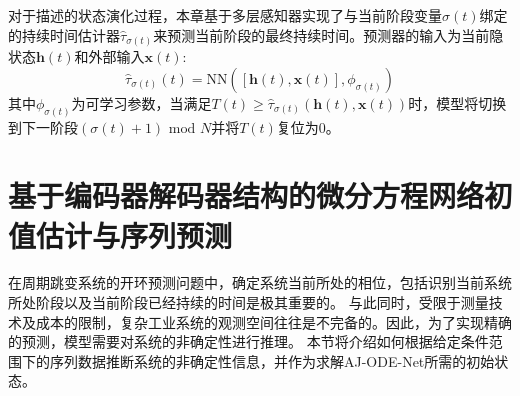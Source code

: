 
对于描述的状态演化过程，本章基于多层感知器实现了与当前阶段变量${\sigma(t)}$绑定的持续时间估计器$\hat{\tau}_{{\sigma(t)}}$来预测当前阶段的最终持续时间。预测器的输入为当前隐状态$\boldsymbol{h}(t)$和外部输入$\boldsymbol{x}(t)$:
\begin{equation}
\hat{\tau}_{\sigma(t)}(t)=\text{NN}\left([\boldsymbol{h}(t), \boldsymbol{x}(t)], \phi_{\sigma(t)}\right)
\end{equation}
其中$\phi_{\sigma(t)}$为可学习参数，当满足$T(t)\geq\hat{\tau}_{\sigma(t)}(\boldsymbol{h}(t),\boldsymbol{x}(t))$时，模型将切换到下一阶段$(\sigma(t)+1)\text{ mod } N$并将$T(t)$复位为0。
\section{基于编码器解码器结构的微分方程网络初值估计与序列预测}
\label{sec:4_encoder_decoder}
在周期跳变系统的开环预测问题中，确定系统当前所处的相位，包括识别当前系统所处阶段以及当前阶段已经持续的时间是极其重要的。
与此同时，受限于测量技术及成本的限制，复杂工业系统的观测空间往往是不完备的。因此，为了实现精确的预测，模型需要对系统的非确定性进行推理。
本节将介绍如何根据给定条件范围下的序列数据推断系统的非确定性信息，并作为求解AJ-ODE-Net所需的初始状态。

